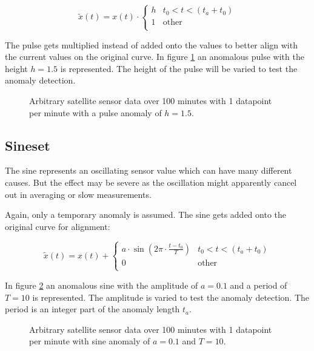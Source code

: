 	\begin{equation}
	\tilde{x}(t) = x(t) \cdot \begin{cases} 
	h & t_0 < t < (t_a+t_0)\\ 
	1 & \text{other} \\
	\end{cases}	
	\end{equation}
	
	The pulse gets multiplied instead of added onto the values to better align with the current values on the original curve. In figure \ref{f:pulseset} an anomalous pulse with the height $h=1.5$ is represented. The height of the pulse will be varied to test the anomaly detection.

	\begin{figure}[htb]
	\centering
	
	\caption{Arbitrary satellite sensor data over 100 minutes with 1 datapoint per minute with a pulse anomaly of $h=1.5$.}
	\label{f:pulseset}
	\end{figure}
		
	\subsection{Sineset}
	The sine represents an oscillating sensor value which can have many different causes. But the effect may be severe as the oscillation might apparently cancel out in averaging or slow measurements.
	
	Again, only a temporary anomaly is assumed. The sine gets added onto the original curve for alignment:
	
	\begin{equation}
	\tilde{x}(t) = x(t) + \begin{cases} 
	a\cdot \sin \left( 2 \pi\cdot \frac{t - t_0}{T} \right) & t_0 < t < (t_a+t_0)\\ 
	0 & \text{other} \\
	\end{cases}	
	\end{equation}
	
	In figure \ref{f:sineset} an anomalous sine with the amplitude of $a=0.1$ and a period of $T=10$ is represented. The amplitude is varied to test the anomaly detection. The period is an integer part of the anomaly length $t_a$.

	\begin{figure}[htb]
	\centering
	
	\caption{Arbitrary satellite sensor data over 100 minutes with 1 datapoint per minute with sine anomaly of $a=0.1$ and $T=10$.}
	\label{f:sineset}
	\end{figure}

